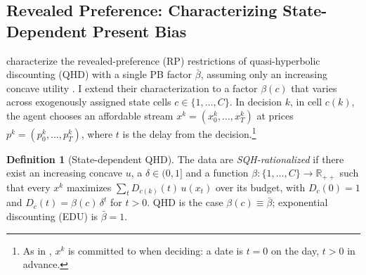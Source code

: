 \documentclass[11pt,a4paper]{article}
\theoremstyle{plain}
\theoremstyle{definition}
\newtheorem{definition}{Definition}
\newcommand{\R}{\mathbb{R}}
\begin{document}
\subsection{Revealed Preference: Characterizing State-Dependent Present Bias}
\label{subsec:RPtheory2}


\citet{eis2020} characterize the revealed-preference (RP) restrictions of quasi-hyperbolic discounting (QHD) with a single PB factor $\bar\beta$, assuming only an increasing concave utility \citep{afriat1967, varian1982}. %
I extend their characterization to a factor $\beta(c)$ that varies across exogenously assigned state cells $c\in\{1,\dots,C\}$. In decision $k$, in cell $c(k)$, the agent chooses an affordable stream $x^k=(x^k_0,\dots,x^k_T)$ at prices $p^k=(p^k_0,\dots,p^k_T)$, where $t$ is the delay from the decision.\footnote{As in \citet{eis2020}, $x^k$ is committed to when deciding: a date is $t=0$ on the day, $t>0$ in advance.}

\begin{definition}[State-dependent QHD]
The data are \emph{SQH-rationalized} if there exist an increasing concave $u$, a $\delta\in(0,1]$ and a function $\beta:\{1,\dots,C\}\to\R_{++}$ such that every $x^k$ maximizes $\sum_{t} D_{c(k)}(t)\,u(x_t)$ over its budget, with $D_c(0)=1$ and $D_c(t)=\beta(c)\,\delta^{t}$ for $t>0$. QHD is the case $\beta(c)\equiv\bar\beta$; exponential discounting (EDU) is $\bar\beta=1$.
\end{definition}
\end{document}
